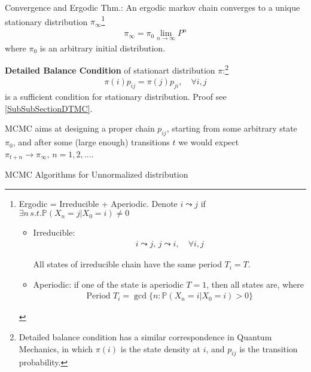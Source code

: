     Convergence and Ergodic Thm.: An ergodic markov chain converges to a unique stationary distribution $ \pi_\infty $\footnote{Ergodic = Irreducible + Aperiodic. Denote $ i\leadsto j $ if $ \exists n\,s.t.  \mathbb{P}\left( X_n=j|X_0=i \right) \neq 0 $
    \begin{itemize}[topsep=2pt,itemsep=0pt]
        \item Irreducible:
        \begin{align}
            i\leadsto j,\, j\leadsto i,\quad \forall i,j 
        \end{align}

        All states of irreducible chain have the same period $ T_i=T $. 

        \item Aperiodic: if one of the state is aperiodic $ T=1 $, then all states are, where
        \begin{align}
            \text{Period }T_i=\gcd \{n: \mathbb{P}\left( X_n=i|X_0=i \right)>0 \} 
        \end{align}
    \end{itemize}
    
        }
    \begin{align}
        \pi_{\infty}=\pi_0 \lim_{n\to\infty}P^n
    \end{align}
    where $ \pi_0 $ is an arbitrary initial distribution.
    
    \textbf{Detailed Balance Condition} of stationart distribution $ \pi $:\footnote{Detailed balance condition has a similar correspondence in Quantum Mechanics, in which $ \pi(i) $ is the state density at $ i $, and $ p_{ij} $ is the transition probability.}
    \begin{align}
        \pi(i)p_{ij}=\pi(j)p_{ji} ,\quad \forall i,j
    \end{align}
    is a sufficient condition for stationary distribution. Proof see \autoref{SubSubSectionDTMC}.
    
    MCMC aims at designing a proper chain $ p_{ij} $, starting from some arbitrary state $ \pi_0 $, and after some (large enough) transitions $ t $ we would expect $ \pi_{t+n}\to \pi_\infty,\,n=1,2,\ldots  $.
    

    
\begin{point}
    MCMC Algorithms for Unnormalized distribution\hypertarget{StatisticalSimulationInverseTransMCMC}{}
\end{point}

